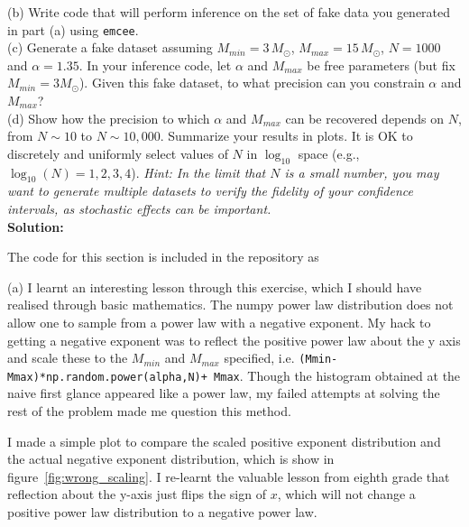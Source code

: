 \documentclass[12pt,usletter,english]{article}
\begin{document}
(b) Write code that will perform inference on the set of fake data you
generated in part (a) using \texttt{emcee}.\\

(c) Generate a fake dataset assuming $M_{min}=3 \, M_{\odot}$,
$M_{max}=15 \, M_{\odot}$, $N=1000$ and $\alpha=1.35$.  In your
inference code, let $\alpha$ and $M_{max}$ be free parameters (but fix
$M_{min}=3 M_{\odot}$).  Given this fake dataset, to what precision
can you constrain $\alpha$ and $M_{max}$? \\

(d) Show how the precision to which $\alpha$ and $M_{max}$ can be
recovered depends on $N$, from $N \sim 10$ to $N\sim10,000$. Summarize
your results in plots.  It is OK to discretely and uniformly select
values of $N$ in $\log_{10}$ space (e.g., $\log_{10}(N) =
1,2,3,4$). \textit{Hint: In the limit that $N$ is a small number, you
  may want to generate multiple datasets to verify the fidelity of
  your confidence intervals, as stochastic effects can be important.}
\\

\noindent \textbf{Solution:}

The code for this section is included in the repository as

(a) I learnt an interesting lesson through this exercise, which I
should have realised through basic mathematics. The numpy power law
distribution does not allow one to sample from a power law with a
negative exponent. My hack to getting a negative exponent was to
reflect the positive power law about the y axis and scale these to the
$M_{min}$ and $M_{max}$ specified,
i.e. \texttt{(Mmin-Mmax)*np.random.power(alpha,N)+ Mmax}. Though the
histogram obtained at the naive first glance appeared like a power
law, my failed attempts at solving the rest of the problem made me
question this method.

I made a simple plot to compare the scaled positive exponent
distribution and the actual negative exponent distribution, which is
show in figure~\ref{fig:wrong_scaling}. I re-learnt the valuable
lesson from eighth grade that reflection about the y-axis just flips
the sign of $x$, which will not change a positive power law
distribution to a negative power law.
\end{document}
